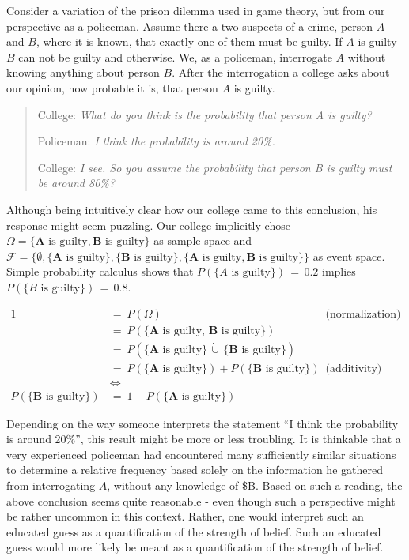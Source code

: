 \documentclass[
]{report}
\theoremstyle{definition}
\begin{document}
Consider a variation of the prison dilemma used in game theory, but from
our perspective as a policeman. Assume there a two suspects of a crime,
person \(A\) and \(B\), where it is known, that exactly one of them must
be guilty. If \(A\) is guilty \(B\) can not be guilty and otherwise. We,
as a policeman, interrogate \(A\) without knowing anything about person
\(B\). After the interrogation a college asks about our opinion, how
probable it is, that person \(A\) is guilty.

\begin{quote}
College: \textit{What do you think is the probability that person A is guilty?} \par
Policeman: \textit{I think the probability is around 20\%.} \par
College: \textit{I see. So you assume the probability that person B is guilty must be around 80\%?}
\end{quote}

Although being intuitively clear how our college came to this
conclusion, his response might seem puzzling. Our college implicitly
chose
\(\Omega = \{\mathbf{A} \text{ is guilty}, \mathbf{B} \text{ is guilty} \}\)
as sample space and
\(\mathcal{F} = \{ \emptyset, \{ \mathbf{A} \text{ is guilty} \}, \{ \mathbf{B} \text{ is guilty} \}, \{ \mathbf{A} \text{ is guilty}, \mathbf{B} \text{ is guilty} \} \}\)
as event space. Simple probability calculus shows that
\(P(\{A \text{ is guilty}\}) \, = \, 0.2\) implies
\(P(\{B \text{ is guilty}\}) \, = \,  0.8\).

\begin{align*}
1 \ &= \ P(\Omega) & \text{(normalization)}\\
  &= \ P(\{\mathbf{A} \text{ is guilty}, \, \mathbf{B} \text{ is guilty}\}) \\
  &= \ P(\{\mathbf{A} \text{ is guilty}\} \, \dot\cup \, \{\mathbf{B} \text{ is guilty}\}) & \text{}\\
  &= \ P(\{\mathbf{A} \text{ is guilty}\}) + P(\{\mathbf{B} \text{ is guilty}\}) & \text{(additivity)}\\
  & \Leftrightarrow \\
P(\{\mathbf{B} \text{ is guilty}\}) \ &= \ 1 - P(\{\mathbf{A} \text{ is guilty}\})
\end{align*}

Depending on the way someone interprets the statement ``I think the
probability is around 20\%'', this result might be more or less
troubling. It is thinkable that a very experienced policeman had
encountered many sufficiently similar situations to determine a relative
frequency based solely on the information he gathered from interrogating
\(A\), without any knowledge of \$B. Based on such a reading, the above
conclusion seems quite reasonable - even though such a perspective might
be rather uncommon in this context. Rather, one would interpret such an
educated guess as a quantification of the strength of belief. Such an
educated guess would more likely be meant as a quantification of the
strength of belief.
\end{document}
